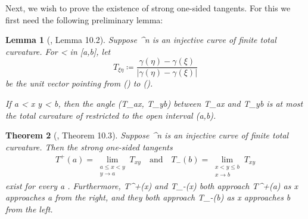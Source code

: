 \documentclass[a4paper, 11pt]{article}
\theoremstyle{plain}
\newtheorem{theorem}{Theorem}[section]
\newtheorem{lemma}[theorem]{Lemma}
\theoremstyle{definition}
\theoremstyle{remark}
\numberwithin{equation}{subsection}
\def\({}
\def\){}
\begin{document}
Next, we wish to prove the existence of strong one-sided tangents. For this we first need the following preliminary lemma:

\begin{lemma}[{\cite{EWW02}, Lemma 10.2}]
\label{Existence of Strong One-sided Tangents}
Suppose \(\gamma \vcentcolon [a,b] \rightarrow {}^{n}\) is an injective curve of finite total curvature. For \(\xi < \eta\) in \([a,b]\), let
\[T_{\xi \eta} \coloneq \frac{\gamma(\eta) - \gamma(\xi)}{|\gamma(\eta) - \gamma(\xi)|}\]
be the unit vector pointing from \(\gamma(\xi)\) to \(\gamma(\eta)\).

If \(a < x \leqslant y < b\), then the angle \(\angle(T_{ax}, T_{yb})\) between \(T_{ax}\) and \(T_{yb}\) is at most the total curvature of \(\gamma\) restricted to the open interval \((a,b)\).
\end{lemma}

\begin{comment}  
\begin{proof}
By the triangle inequality for geodesic distances in the unit sphere, we have that
\begin{align*}
\operatorname{TotalCurvature}(\gamma\vert_{(a,b)}) &\geqslant \angle(T_{ax}, T_{xy}) + \angle(T_{xy}, T_{yb}) \\
&\geqslant \angle(T_{ax}, T_{yb}).
\end{align*}
\end{proof}
\end{comment}


\begin{theorem}[{\cite{EWW02}, Theorem 10.3}]
Suppose \(\gamma \vcentcolon [A,B] \rightarrow {}^{n}\) is an injective curve of finite total curvature. Then the strong one-sided tangents
\begin{gather}
T^{+}(a) = \lim_{\substack{a \leqslant x < y \\ y \rightarrow a}} T_{xy} \quad \text{and} \quad T_{-}(b) = \lim_{\substack{x < y \leqslant b \\ x \rightarrow b}} T_{xy}
\end{gather}
exist for every \(a \in [A, B)\) and every \(b \in (A,B]\). Furthermore, \(T^{+}(x)\) and \(T_{-}(x)\) both approach \(T^{+}(a)\) as \(x\) approaches \(a\) from the right, and they both approach \(T_{-}(b)\) as \(x\) approaches \(b\) from the left.
\end{theorem}
\end{document}
